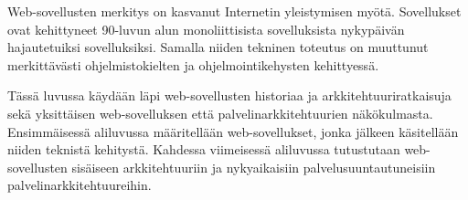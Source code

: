 Web-sovellusten merkitys on kasvanut Internetin yleistymisen myötä. Sovellukset ovat kehittyneet 90-luvun alun monoliittisista sovelluksista nykypäivän hajautetuiksi sovelluksiksi. Samalla niiden tekninen toteutus on muuttunut merkittävästi ohjelmistokielten ja ohjelmointikehysten kehittyessä.

Tässä luvussa käydään läpi web-sovellusten historiaa ja arkkitehtuuriratkaisuja sekä yksittäisen web-sovelluksen että palvelinarkkitehtuurien näkökulmasta. Ensimmäisessä aliluvussa määritellään web-sovellukset, jonka jälkeen käsitellään niiden teknistä kehitystä. Kahdessa viimeisessä aliluvussa tutustutaan web-sovellusten si\-säi\-seen arkkitehtuuriin ja nykyaikaisiin palvelusuuntautuneisiin palvelinarkkitehtuureihin.